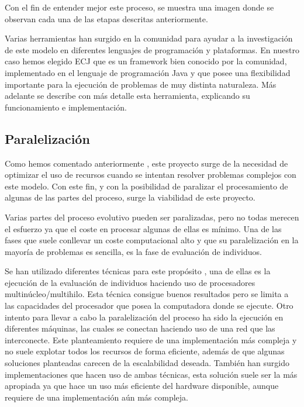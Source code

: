 Con el fin de entender mejor este proceso, se muestra una imagen  donde se observan cada una de las etapas descritas anteriormente.


Varias herramientas han surgido en la comunidad para ayudar a la investigación de este modelo en diferentes lenguajes de programación y plataformas. En nuestro caso hemos elegido ECJ que es un framework bien conocido por la comunidad, implementado en el lenguaje de programación Java y que posee una flexibilidad importante para la ejecución de problemas de muy distinta naturaleza. M\'as adelante  se describe con m\'as detalle esta herramienta, explicando su funcionamiento e implementación.

\subsection{Paralelizaci\'on\label{analisis-evolutivos-paralelizacion}}

Como hemos comentado anteriormente , este proyecto surge de la necesidad de optimizar el uso de recursos cuando se intentan resolver problemas complejos con este modelo. Con este fin, y con la posibilidad de paralizar el procesamiento de algunas de las partes del proceso, surge la viabilidad de este proyecto.

Varias partes del proceso evolutivo pueden ser paralizadas, pero no todas merecen el esfuerzo ya que el coste en procesar algunas de ellas es mínimo. Una de las fases que suele conllevar un coste computacional alto y que su paralelizaci\'on en la mayoría de problemas es sencilla, es la fase de evaluaci\'on de individuos.

Se han utilizado diferentes técnicas para este prop\'osito \cite{article-parallel-review}\cite{article-paraller-fpga}\cite{Andre:1996:PGP:270195.270224}\cite{DBLP:journals/gpem/VegaTV03}, una de ellas es la ejecución de la evaluación de individuos haciendo uso de procesadores multin\'ucleo/multihilo. Esta t\'ecnica consigue buenos resultados pero se limita a las capacidades del procesador que posea la computadora donde se ejecute. Otro intento para llevar a cabo la paralelizaci\'on del proceso ha sido la ejecución en diferentes m\'aquinas, las cuales se conectan haciendo uso de una red que las interconecte. Este planteamiento requiere de una implementación m\'as compleja y no suele explotar todos los recursos de forma eficiente, adem\'as de que algunas soluciones planteadas carecen de la escalabilidad deseada. Tambi\'en han surgido implementaciones que hacen uso de ambas t\'ecnicas, esta solución suele ser la m\'as apropiada ya que hace un uso m\'as eficiente del hardware disponible, aunque requiere de una implementación a\'un m\'as compleja.

